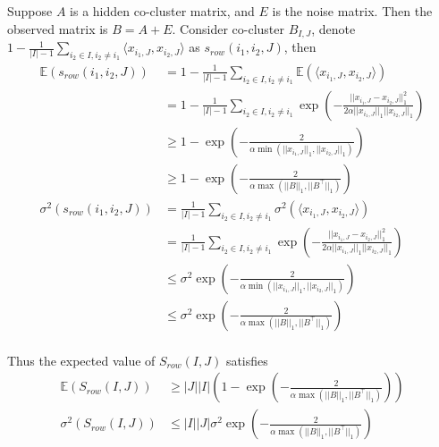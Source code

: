 \documentclass[12pt]{article}
\begin{document}
Suppose $A$ is a hidden co-cluster matrix, and $E$ is the noise matrix. Then the observed matrix is $B = A + E$. Consider co-cluster $B_{I,J}$, denote $1 - \frac{1}{|I|-1} \sum_{i_2 \in I, i_2 \neq i_1} \langle x_{i_1,J}, x_{i_2,J}\rangle$ as $s_{row}(i_1, i_2, J)$, then
\begin{align*}
    \mathbb{E}(s_{row}(i_1, i_2, J)) & = 1 - \frac{1}{|I|-1} \sum_{i_2 \in I, i_2 \neq i_1} \mathbb{E}(\langle x_{i_1,J}, x_{i_2,J}\rangle)                                    \\
                                     & = 1 - \frac{1}{|I|-1} \sum_{i_2 \in I, i_2 \neq i_1} \exp(-\frac{||x_{i_1,J} - x_{i_2,J}||_1^2}{2\alpha||x_{i_1,J}||_1||x_{i_2,J}||_1}) \\
                                     & \ge 1 - \exp(-\frac{2}{\alpha \min(||x_{i_1,J}||_1, ||x_{i_2,J}||_1)})                                                                  \\
                                     & \ge 1 - \exp(-\frac{2}{\alpha \max(||B||_1, ||B^\top||_1)})                                                                             \\
    \sigma^2(s_{row}(i_1, i_2, J))   & = \frac{1}{|I|-1} \sum_{i_2 \in I, i_2 \neq i_1} \sigma^2(\langle x_{i_1,J}, x_{i_2,J}\rangle)                                          \\
                                     & = \frac{1}{|I|-1} \sum_{i_2 \in I, i_2 \neq i_1} \exp(-\frac{||x_{i_1,J} - x_{i_2,J}||_1^2}{2\alpha||x_{i_1,J}||_1||x_{i_2,J}||_1})     \\
                                     & \le \sigma^2 \exp(-\frac{2}{\alpha \min(||x_{i_1,J}||_1, ||x_{i_2,J}||_1)})                                                             \\
                                     & \le \sigma^2 \exp(-\frac{2}{\alpha \max(||B||_1, ||B^\top||_1)})                                                                        \\
\end{align*}

Thus the expected value of $S_{row}(I,J)$ satisfies
\begin{align*}
    \mathbb{E}(S_{row}(I,J)) & \ge |J||I| \left(1 - \exp(-\frac{2}{\alpha \max(||B||_1, ||B^\top||_1)}) \right) \\
    \sigma^2(S_{row}(I,J))   & \le |I||J| \sigma^2 \exp(-\frac{2}{\alpha \max(||B||_1, ||B^\top||_1)})          \\
\end{align*}
\end{document}
